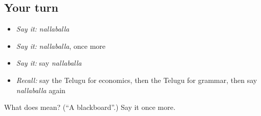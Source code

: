 \subsection*{Your turn}
\begin{itemize}
\raggedright
  \item \emph{Say it:} \emph{nallaballa}
  \item \emph{Say it:} \emph{nallaballa}, once more
  \item \emph{Say it:} say \emph{nallaballa}
  \item \emph{Recall:} say the Telugu for economics, then the Telugu for grammar, then say \emph{nallaballa} again
\end{itemize}

\begin{tcolorbox}[breakable,colback=teal!4,colframe=teal!35!black,title={Before you move on}]
What does  mean? (\textquotedblleft{}A blackboard\textquotedblright{}.) Say it once more.
\end{tcolorbox}
